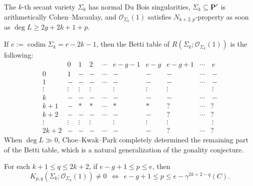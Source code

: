 \documentclass[graybox]{svmult}
\newcommand{\kk}{\mathbf{k}}
\newcommand{\sO}{\mathscr{O}}
\def\nP{\mathbf{P}}
\def\codim{\operatorname{codim}}
\begin{document}
\begin{theorem}[{$\operatorname{char}(\kk)=0$}]\label{thm:ENP}
The $k$-th secant variety $\Sigma_k$ has normal Du Bois singularities, $\Sigma_k \subseteq \nP^r$ is arithmetically Cohen--Macaulay, and $\sO_{\Sigma_k}(1)$ satisfies $N_{k+2, p}$-property as soon as $\deg L \geq 2g+2k+1+p$.
\end{theorem}

\noindent If $e:=\codim \Sigma_k = r-2k-1$, then the Betti table of $R(\Sigma_k; \sO_{\Sigma_k}(1))$ is the following:
$$
\begin{array}{c|ccccccccc}
& 0 & 1 & 2 & ~\cdots &e-g-1 & e-g &  e-g+1 & \cdots & ~e \\ \hline
0 & 1 & - & - & ~\cdots  & - & - & - & \cdots & ~-  \\
1 & - & -  & -  & ~\cdots & - & - & - & \cdots & ~- \\
\vdots & \vdots  & \vdots  & \vdots & & \vdots   & \vdots  & \vdots & & ~\vdots \\
k & - & - & - & ~\cdots & - & - & - & \cdots & ~- \\
k+1 & - & * & * & ~\cdots & * & * & ? & \cdots & ? \\
k+2 & - & - & - & ~\cdots & - & -  & ? & \cdots & ? \\
\vdots & \vdots  & \vdots  & \vdots & & \vdots  & \vdots &\vdots  & & ~\vdots\\
2k+2 & - & - & - & ~\cdots & -  & - & ? & \cdots & ?
\end{array}
$$
When $\deg L \gg 0$, Choe--Kwak--Park \cite{CKP} completely determined the remaining part of the Betti table, which is a natural generalization of the gonality conjecture.

\begin{theorem}[{$\operatorname{char}(\kk)=0$}]\label{thm:CKP}
For each $k+1 \leq q \leq 2k+2$, if $e-g+1 \leq p \leq e$, then 
$$
K_{p,q}(\Sigma_k; \sO_{\Sigma_k}(1)) \neq 0~~\Longleftrightarrow~~e - g+1 \leq p \leq e - \gamma^{2k+2-q}(C).
$$
\end{theorem}
\end{document}
